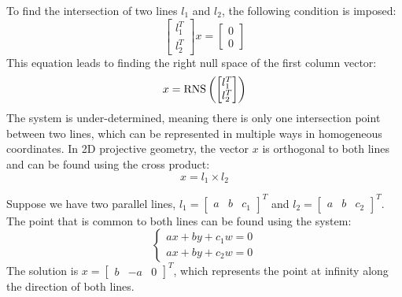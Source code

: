To find the intersection of two lines $l_1$ and $l_2$, the following condition is imposed:
\[\begin{bmatrix} l_1^T \\ l_2^T \end{bmatrix} x = \begin{bmatrix} 0 \\ 0 \end{bmatrix}\]
This equation leads to finding the right null space of the first column vector:
\[x=\textnormal{RNS}\left(\begin{bmatrix}l_1^T \\ l_2^T \end{bmatrix} \right)\]
The system is under-determined, meaning there is only one intersection point between two lines, which can be represented in multiple ways in homogeneous coordinates.
In 2D projective geometry, the vector $x$ is orthogonal to both lines and can be found using the cross product:
\[x=l_1 \times l_2\]
\begin{example}
    Suppose we have two parallel lines, $l_1={\begin{bmatrix} a & b & c_1 \end{bmatrix}}^T$ and $l_2={\begin{bmatrix} a & b & c_2 \end{bmatrix}}^T$. 
    The point that is common to both lines can be found using the system:
    \[
        \begin{cases}
            ax+by+c_1w=0 \\
            ax+by+c_2w=0
        \end{cases}
    \]
    The solution is ${x=\begin{bmatrix} b & -a & 0 \end{bmatrix}}^T$, which represents the point at infinity along the direction of both lines.
\end{example}


